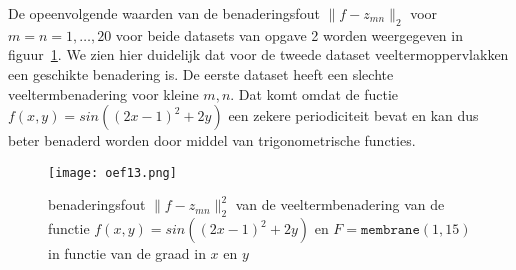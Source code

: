 De opeenvolgende waarden van de benaderingsfout $\lVert f-z_{mn} \rVert_2$ voor $m = n = 1,\dots,20$ voor beide datasets van opgave 2 worden weergegeven in figuur~\ref{fig:oef13}. We zien hier duidelijk dat voor de tweede dataset veeltermoppervlakken een geschikte benadering is. De eerste dataset heeft een slechte veeltermbenadering voor kleine $m,n$. Dat komt omdat de fuctie $f(x,y)=sin((2x-1)^2+2y)$ een zekere periodiciteit bevat en kan dus beter benaderd worden door middel van trigonometrische functies.

\begin{figure}[H]
    \centering
    \texttt{[image: oef13.png]}
    \caption{benaderingsfout $\lVert f-z_{mn} \rVert_2^2$ van de veeltermbenadering van de functie $f(x,y)=sin((2x-1)^2+2y)$ en $F=\texttt{membrane}(1,15)$ in functie van de graad in $x$ en $y$}
    \label{fig:oef13}
\end{figure}